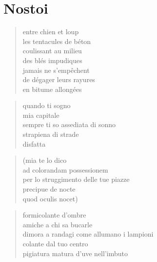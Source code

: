 \chapter*{Nostoi}


\begin{otherlanguage}{french}
    \begin{verse}
        entre chien et loup\\
        les tentacules de béton\\
        coulissant au milieu\\
        des blés impudiques\\
        jamais ne s'empêchent\\
        de dégager leurs rayures\\
        en bitume allongées
    \end{verse}
\end{otherlanguage}

\clearpage


\begin{verse}
    quando ti sogno\\
    mia capitale\\
    sempre ti so assediata di sonno\\
    strapiena di strade\\
    disfatta
\end{verse}

\begin{verse}
    (mia te lo dico\\
    ad colorandam possessionem\\
    per lo struggimento delle tue piazze\\
    precipue de nocte\\
    quod oculis nocet)
\end{verse}

\begin{verse}
    formicolante d’ombre\\
    amiche a chi sa bucarle\\
    dimora a randagi come allumano i lampioni\\
    colante dal tuo centro\\
    pigiatura matura d’uve nell’imbuto
\end{verse}

\clearpage


